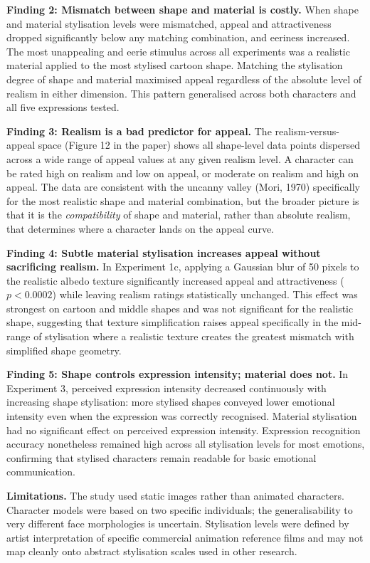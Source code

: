 \documentclass[11pt, a4paper]{article}
\begin{document}
\textbf{Finding 2: Mismatch between shape and material is costly.} When shape and material stylisation levels were mismatched, appeal and attractiveness dropped significantly below any matching combination, and eeriness increased. The most unappealing and eerie stimulus across all experiments was a realistic material applied to the most stylised cartoon shape. Matching the stylisation degree of shape and material maximised appeal regardless of the absolute level of realism in either dimension. This pattern generalised across both characters and all five expressions tested.

\textbf{Finding 3: Realism is a bad predictor for appeal.} The realism-versus-appeal space (Figure 12 in the paper) shows all shape-level data points dispersed across a wide range of appeal values at any given realism level. A character can be rated high on realism and low on appeal, or moderate on realism and high on appeal. The data are consistent with the uncanny valley (Mori, 1970) specifically for the most realistic shape and material combination, but the broader picture is that it is the \textit{compatibility} of shape and material, rather than absolute realism, that determines where a character lands on the appeal curve.

\textbf{Finding 4: Subtle material stylisation increases appeal without sacrificing realism.} In Experiment 1c, applying a Gaussian blur of 50 pixels to the realistic albedo texture significantly increased appeal and attractiveness ($p < 0.0002$) while leaving realism ratings statistically unchanged. This effect was strongest on cartoon and middle shapes and was not significant for the realistic shape, suggesting that texture simplification raises appeal specifically in the mid-range of stylisation where a realistic texture creates the greatest mismatch with simplified shape geometry.

\textbf{Finding 5: Shape controls expression intensity; material does not.} In Experiment 3, perceived expression intensity decreased continuously with increasing shape stylisation: more stylised shapes conveyed lower emotional intensity even when the expression was correctly recognised. Material stylisation had no significant effect on perceived expression intensity. Expression recognition accuracy nonetheless remained high across all stylisation levels for most emotions, confirming that stylised characters remain readable for basic emotional communication.

\textbf{Limitations.} The study used static images rather than animated characters. Character models were based on two specific individuals; the generalisability to very different face morphologies is uncertain. Stylisation levels were defined by artist interpretation of specific commercial animation reference films and may not map cleanly onto abstract stylisation scales used in other research.
\end{document}
